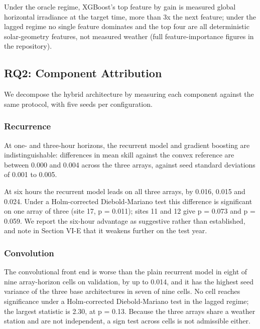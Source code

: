 Under the oracle regime, XGBoost's top feature by gain is measured
global horizontal irradiance at the target time, more than 3x the next
feature; under the lagged regime no single feature dominates and the
top four are all deterministic solar-geometry features, not measured
weather (full feature-importance figures in the repository).

\subsection{RQ2: Component Attribution}
\label{sec:rq2}

We decompose the hybrid architecture by measuring each component against
the same protocol, with five seeds per configuration.



\subsubsection{Recurrence}

At one- and three-hour horizons, the recurrent model and gradient
boosting are indistinguishable: differences in mean skill against the
convex reference are between 0.000 and 0.004 across the three arrays,
against seed standard deviations of 0.001 to 0.005.

At six hours the recurrent model leads on all three arrays, by 0.016,
0.015 and 0.024. Under a Holm-corrected Diebold-Mariano test this
difference is significant on one array of three (site 17, p = 0.011);
sites 11 and 12 give p = 0.073 and p = 0.059. We report the six-hour
advantage as suggestive rather than established, and note in Section
VI-E that it weakens further on the test year.

\subsubsection{Convolution}

The convolutional front end is worse than the plain recurrent model in
eight of nine array-horizon cells on validation, by up to 0.014, and it
has the highest seed variance of the three base architectures in seven
of nine cells. No cell reaches significance under a Holm-corrected
Diebold-Mariano test in the lagged regime; the largest statistic is
2.30, at p = 0.13. Because the three arrays share a weather station and
are not independent, a sign test across cells is not admissible either.


